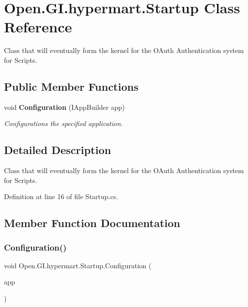 \section{Open.\+G\+I.\+hypermart.\+Startup Class Reference}
\label{class_open_1_1_g_i_1_1hypermart_1_1_startup}


Class that will eventually form the kernel for the O\+Auth Authentication system for Scripts.  


\subsection*{Public Member Functions}
\begin{DoxyCompactItemize}
\item 
void \textbf{ Configuration} (I\+App\+Builder app)
\begin{DoxyCompactList}\small\item\em Configurations the specified application. \end{DoxyCompactList}\end{DoxyCompactItemize}


\subsection{Detailed Description}
Class that will eventually form the kernel for the O\+Auth Authentication system for Scripts. 



Definition at line 16 of file Startup.\+cs.



\subsection{Member Function Documentation}
\mbox{\label{class_open_1_1_g_i_1_1hypermart_1_1_startup_a92c0680464156e20b32f17ef38e08a83}} 
\subsubsection{Configuration()}
{\footnotesize\ttfamily void Open.\+G\+I.\+hypermart.\+Startup.\+Configuration (\begin{DoxyParamCaption}\item[{I\+App\+Builder}]{app }\end{DoxyParamCaption})}



